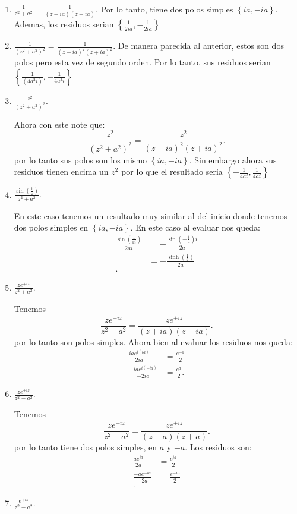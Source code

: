\documentclass{report}
\begin{document}
\begin{enumerate}
  \item $\frac{1}{z^2 + a^2} = \frac{1}{\left( z - ia \right) \left( z + ia \right) }$. Por lo tanto, tiene dos polos simples $\left\{ ia, -ia \right\} $. Ademas, los residuos serian $\left\{ \frac{1}{2ia}, - \frac{1}{2ia} \right\} $

  \item $\frac{1}{\left( z^2 + a^2 \right)^2} = \frac{1}{\left( z - ia \right)^2 \left( z + ia \right)^2}	$. De manera parecida al anterior, estos son dos polos pero esta vez de segundo orden. Por lo tanto, sus residuos serian $\left\{ \frac{1}{\left( 4a^{3}i \right) } , - \frac{1}{4a^{3}i}\right\} $
  \item $\frac{z^2}{\left( z^2 + a^2 \right)^2}$.

    Ahora con este note que: \[
      \frac{z^2}{\left( z^2 + a^2 \right)^2} = \frac{z^2}{\left( z - ia \right)^2\left( z + ia \right)^2}
      .\] por lo tanto sus polos son los mismo $\left\{ ia, -ia \right\} $. Sin embargo ahora sus residuos tienen encima un $z^2$ por lo que el resultado seria $\left\{ -\frac{1}{4ai}, \frac{1}{4ai} \right\} $
  \item $\frac{\sin\left( \frac{1}{z} \right) }{z^2 + a^2}$.

    En este caso tenemos un resultado muy similar al del inicio donde tenemos dos polos simples en $\left\{ ia, -ia \right\} $. En este caso al evaluar nos queda:
    \begin{align*}
      \frac{\sin\left( \frac{1}{ai} \right) }{2ai} &= -\frac{\sin\left( -\frac{i}{a} \right)i }{2a} \\
      &= -\frac{\sinh\left( \frac{1}{a} \right) }{2a} \\
    .\end{align*}
  \item $\frac{ze^{+iz}}{z^2 + a^2}$.

    Tenemos \[
      \frac{ze^{+iz}}{z^2 + a^2} = \frac{ze^{+iz}}{\left( z + ia \right) \left( z - ia \right) }
      .\] por lo tanto son polos simples. Ahora bien al evaluar los residuos nos queda:
    \begin{align*}
      \frac{iae^{i\left( ia \right) }}{2ia} &= \frac{e^{-a}}{2} \\
      \frac{-iae^{i\left( -ia \right) }}{-2ia} &= \frac{e^{a}}{2}
    .\end{align*}
  \item $\frac{ze^{+iz}}{z^2 - a^2}$.

    Tenemos \[
      \frac{ze^{+iz}}{z^2 - a^2} = \frac{ze^{+iz}}{\left( z - a \right) \left( z + a \right) }
      .\] por lo tanto tiene dos polos simples, en $a$ y $-a$. Los residuos son:
    \begin{align*}
      \frac{ae^{ia}}{2a} &= \frac{e^{ia}}{2} \\
      \frac{-ae^{-ia}}{-2a} &= \frac{e^{-ia}}{2} \\
    .\end{align*}
  \item $\frac{e^{+iz}}{z^2 - a^2}$.


\end{enumerate}
\end{document}

